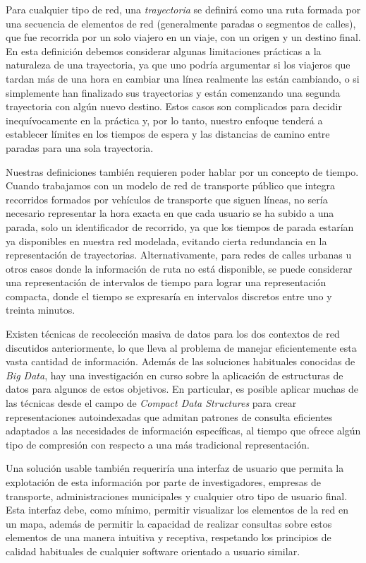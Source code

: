     Para cualquier tipo de red, una \textit{trayectoria} se definir\'a como una ruta formada por una secuencia de elementos de red (generalmente paradas o segmentos de calles), que fue recorrida por un solo viajero en un viaje, con un origen y un destino final. En esta definici\'on debemos considerar algunas limitaciones pr\'acticas a la naturaleza de una trayectoria, ya que uno podr\'ia argumentar si los viajeros que tardan m\'as de una hora en cambiar una l\'inea realmente las est\'an cambiando, o si simplemente han finalizado sus trayectorias y est\'an comenzando una segunda trayectoria con alg\'un nuevo destino. Estos casos son complicados para decidir inequ\'ivocamente en la pr\'actica y, por lo tanto, nuestro enfoque tender\'a a establecer l\'imites en los tiempos de espera y las distancias de camino entre paradas para una sola trayectoria.
    
    Nuestras definiciones tambi\'en requieren poder hablar por un concepto de tiempo. Cuando trabajamos con un modelo de red de transporte p\'ublico que integra recorridos formados por veh\'iculos de transporte que siguen l\'ineas, no ser\'ia necesario representar la hora exacta en que cada usuario se ha subido a una parada, solo un identificador de recorrido, ya que los tiempos de parada estar\'ian ya disponibles en nuestra red modelada, evitando cierta redundancia en la representaci\'on de trayectorias.
    Alternativamente, para redes de calles urbanas u otros casos donde la informaci\'on de ruta no est\'a disponible, se puede considerar una representaci\'on de intervalos de tiempo para lograr una representaci\'on compacta, donde el tiempo se expresar\'ia en intervalos discretos entre uno y treinta minutos.
    
    Existen t\'ecnicas de recolecci\'on masiva de datos para los dos contextos de red discutidos anteriormente, lo que lleva al problema de manejar eficientemente esta vasta cantidad de informaci\'on. Adem\'as de las soluciones habituales conocidas de \textit{Big Data}, hay una investigaci\'on en curso sobre la aplicaci\'on de estructuras de datos para algunos de estos objetivos. En particular, es posible aplicar muchas de las t\'ecnicas desde el campo de \textit{Compact Data Structures} para crear representaciones autoindexadas que admitan patrones de consulta eficientes adaptados a las necesidades de informaci\'on espec\'ificas, al tiempo que ofrece alg\'un tipo de compresi\'on con respecto a una m\'as tradicional representaci\'on.
    
    Una soluci\'on usable tambi\'en requerir\'ia una interfaz de usuario que permita la explotaci\'on de esta informaci\'on por parte de investigadores, empresas de transporte, administraciones municipales y cualquier otro tipo de usuario final. Esta interfaz debe, como m\'inimo, permitir visualizar los elementos de la red en un mapa, adem\'as de permitir la capacidad de realizar consultas sobre estos elementos de una manera intuitiva y receptiva, respetando los principios de calidad habituales de cualquier software orientado a usuario similar.


